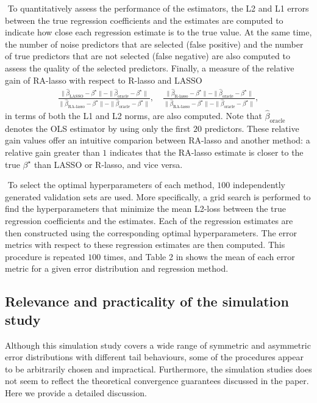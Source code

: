 $ $\newline
To quantitatively assess the performance of the estimators, the L2 and L1 errors between the true regression coefficients and the estimates are computed to indicate how close each regression estimate is to the true value. At the same time, the number of noise predictors that are selected (false positive) and the number of true predictors that are not selected (false negative) are also computed to assess the quality of the selected predictors. Finally, a measure of the relative gain of RA-lasso with respect to R-lasso and LASSO
\begin{align*}
\frac{\|\hat{\beta}_{\text{LASSO}} - \beta^\star\| - \|\hat{\beta}_{\text{oracle}} - \beta^\star\|}{\|\hat{\beta}_{\text{RA-lasso}} - \beta^\star\| - \|\hat{\beta}_{\text{oracle}} - \beta^\star\|}, \quad
\frac{\|\hat{\beta}_{\text{R-lasso}} - \beta^\star\| - \|\hat{\beta}_{\text{oracle}} - \beta^\star\|}{\|\hat{\beta}_{\text{RA-lasso}} - \beta^\star\| - \|\hat{\beta}_{\text{oracle}} - \beta^\star\|},
\end{align*}
in terms of both the L1 and L2 norms, are also computed. Note that $\hat{\beta}_{\text{oracle}}$ denotes the OLS estimator by using only the first $20$ predictors. These relative gain values offer an intuitive comparion between RA-lasso and another method: a relative gain greater than $1$ indicates that the RA-lasso estimate is closer to the true $\beta^\star$ than LASSO or R-lasso, and vice versa.

$ $\newline
To select the optimal hyperparameters of each method, $100$ independently generated validation sets are used. More specifically, a grid search is performed to find the hyperparameters that minimize the mean L2-loss between the true regression coefficients and the estimates. Each of the regression estimates are then constructed using the corresponding optimal hyperparameters. The error metrics with respect to these regression estimates are then computed. This procedure is repeated $100$ times, and Table 2 in \citet{fan2017estimation} shows the mean of each error metric for a given error distribution and regression method.

\subsection{Relevance and practicality of the simulation study}\label{sec:relevance}
Although this simulation study covers a wide range of symmetric and asymmetric error distributions with different tail behaviours, some of the procedures appear to be arbitrarily chosen and impractical. Furthermore, the simulation studies does not seem to reflect the theoretical convergence guarantees discussed in the paper. Here we provide a detailed discussion.

